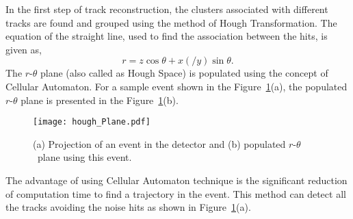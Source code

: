 In the first step of track reconstruction, the clusters associated
with different tracks are found and grouped using the method of Hough
Transformation\cite{hought1,hought}. The equation of the straight line,
used to find the association between the hits, is given as,
\begin{equation}
  r=z\cos\theta+x\left(/y\right)\sin\theta. \label{eq:hough}
\end{equation}
The \mbox{$r$-$\theta$} plane (also called as Hough Space) is
populated using the concept of Cellular Automaton\cite{cellular}.
For a sample event shown in the Figure~\ref{fig:houghPl}(a),
the populated \mbox{$r$-$\theta$} plane is presented in the
Figure~\ref{fig:houghPl}(b).
\begin{figure}[h]
  \texttt{[image: hough\_Plane.pdf]} 
  \caption{(a) Projection of an event in the detector and
    (b) populated $r$-$\theta$~plane using this event.}
  \label{fig:houghPl}
\end{figure}
The advantage of using Cellular Automaton technique is the significant
reduction of computation time to find a trajectory in the event.
This method can detect all the tracks avoiding the noise hits as
shown in Figure~\ref{fig:houghPl}(a).

